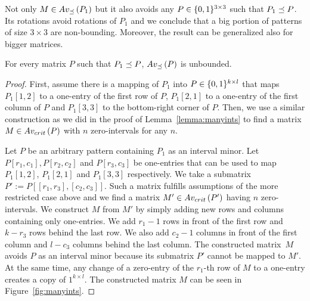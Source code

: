Not only $M\in Av_{\preceq}\left(P_1\right)$ but it also avoids any $P\in\{0,1\}^{3\times3}$ such that $P_1\preceq P$. Its rotations avoid rotations of $P_1$ and we conclude that a big portion of patterns of size $3\times3$ are non-bounding. Moreover, the result can be generalized also for bigger matrices.

\begin{thm}
\label{thm:unbound}
For every matrix $P$ such that $P_1\preceq P$, $Av_{\preceq}\left(P\right)$ is unbounded.
\end{thm}
\begin{proof}
First, assume there is a mapping of $P_1$ into $P\in\{0,1\}^{k\times l}$ that maps $P_1[1,2]$ to a one-entry of the first row of $P$, $P_1[2,1]$ to a one-entry of the first column of $P$ and $P_1[3,3]$ to the bottom-right corner of $P$. Then, we use a similar construction as we did in the proof of Lemma~\ref{lemma:manyints} to find a matrix $M\in Av_{crit}\left(P\right)$ with $n$ zero-intervals for any $n$.

Let $P$ be an arbitrary pattern containing $P_1$ as an interval minor. Let $P[r_1,c_1],P[r_2,c_2]$ and $P[r_3,c_3]$ be one-entries that can be used to map $P_1[1,2]$, $P_1[2,1]$ and $P_1[3,3]$ respectively. We take a submatrix~$P':=P[[r_1,r_3],[c_2,c_3]]$. Such a matrix fulfills assumptions of the more restricted case above and we find a matrix $M'\in Av_{crit}\left(P'\right)$ having $n$ zero-intervals. We construct $M$ from $M'$ by simply adding new rows and columns containing only one-entries. We add $r_1-1$ rows in front of the first row and $k-r_3$ rows behind the last row. We also add $c_2-1$ columns in front of the first column and $l-c_3$ columns behind the last column. The constructed matrix~$M$ avoids $P$ as an interval minor because its submatrix $P'$ cannot be mapped to $M'$. At the same time, any change of a zero-entry of the $r_1$-th row of $M$ to a one-entry creates a copy of ${1}^{k\times l}$. The constructed matrix $M$ can be seen in Figure~\ref{fig:manyints}.
\end{proof}

